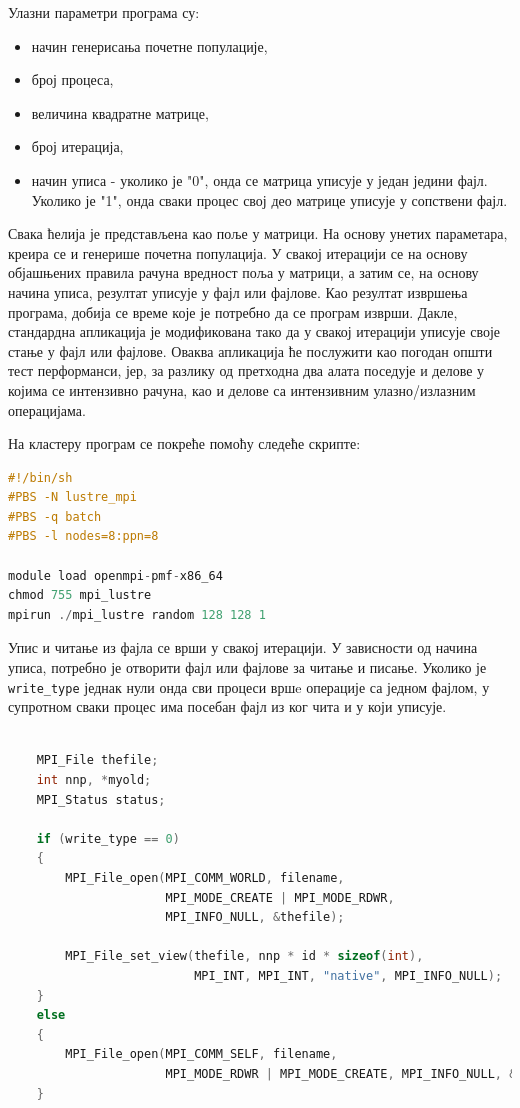 Улазни параметри програма су:
\begin{itemize}
\item начин генерисања почетне популације,
\item број процеса,
\item величина квадратне матрице,
\item број итерација,
\item начин уписа - уколико је "0", онда се матрица уписује у један једини фајл. Уколико је "1", онда сваки процес свој део матрице уписује у сопствени фајл.
\end{itemize}
Свака ћелија је представљена као поље у матрици. На основу унетих параметара, креира се и генерише почетна популација. У свакој итерацији се на основу објашњених правила рачуна вредност поља у матрици, а затим се, на основу начина уписа, резултат уписује у фајл или фајлове. Као резултат извршења програма, добија се време које је потребно да се програм изврши. Дакле, стандардна апликација је модификована тако да у свакој итерацији уписује своје стање у фајл или фајлове. Оваква апликација ће послужити као погодан општи тест перформанси, јер, за разлику од претходна два алата поседује и делове у којима се интензивно рачуна, као и делове са интензивним улазно/излазним операцијама. 

На кластеру програм се покреће помоћу следеће скрипте:

\begin{lstlisting}[style=nonumbers,frame=single,language=C, caption=Скрипта за покретање програма на кластеру]
#!/bin/sh
#PBS -N lustre_mpi
#PBS -q batch
#PBS -l nodes=8:ppn=8

module load openmpi-pmf-x86_64
chmod 755 mpi_lustre
mpirun ./mpi_lustre random 128 128 1 
\end{lstlisting}

Упис и читање из фајла се врши у свакој итерацији. У зависности од начина уписа, потребно је отворити фајл или фајлове за читање и писање. Уколико је \texttt{write\_type} једнак нули онда сви процеси вршe операције са једном фајлом, у супротном сваки процес има посебан фајл из ког чита и у који уписује.

\begin{lstlisting}[style=nonumbers,frame=single,language=C, caption=Део кода за отварање фајлова за читање и писање]

	MPI_File thefile;
	int nnp, *myold;
	MPI_Status status;	

    if (write_type == 0) 
    {
        MPI_File_open(MPI_COMM_WORLD, filename,
                      MPI_MODE_CREATE | MPI_MODE_RDWR,
                      MPI_INFO_NULL, &thefile);

        MPI_File_set_view(thefile, nnp * id * sizeof(int),
                          MPI_INT, MPI_INT, "native", MPI_INFO_NULL);
    }
    else 
    {
        MPI_File_open(MPI_COMM_SELF, filename,
                      MPI_MODE_RDWR | MPI_MODE_CREATE, MPI_INFO_NULL, &thefile);
    } 
\end{lstlisting}


